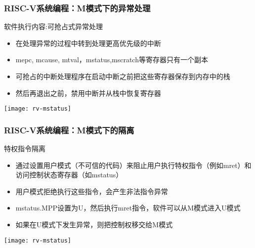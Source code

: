 
\begin{frame}
    \frametitle{RISC-V系统编程：M模式下的异常处理}
    软件执行内容:可抢占式异常处理
    \begin{itemize}
        \item 在处理异常的过程中转到处理更高优先级的中断
        \item mepc, mcause, mtval，mstatus,mscratch等寄存器只有一个副本
        \item 可抢占的中断处理程序在启动中断之前把这些寄存器保存到内存中的栈
        \item 然后再退出之前，禁用中断并从栈中恢复寄存器
        
    \end{itemize}
    
    \centering
    \texttt{[image: rv-mstatus]}
    
\end{frame}

\begin{frame}
    \frametitle{RISC-V系统编程：M模式下的隔离}
    特权指令隔离
    \begin{itemize}
        \item 通过设置用户模式（不可信的代码）来阻止用户执行特权指令（例如mret）和访问控制状态寄存器（如mstatus）
        \item 用户模式拒绝执行这些指令，会产生非法指令异常
        \item mstatus.MPP设置为U，然后执行mret指令，软件可以从M模式进入U模式
        \item 如果在U模式下发生异常，则把控制权移交给M模式
        
    \end{itemize}
    
    \centering
    \texttt{[image: rv-mstatus]}
    
\end{frame}


